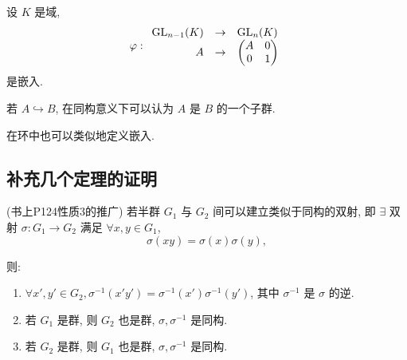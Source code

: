 \documentclass[color=black,device=normal,lang=cn,mode=geye]{elegantnote}
\begin{document}
\begin{example}
    设 $K$ 是域,
    \[\varphi:\begin{array}{rcl}
        \operatorname{GL} _{n-1}(K) & \to & \operatorname{GL} _n(K) \\
        A & \to & \begin{pmatrix}
            A & 0 \\
            0 & 1 \\
        \end{pmatrix} \\
    \end{array}\]
    是嵌入.
\end{example}
若 $A\hookrightarrow B$, 在同构意义下可以认为 $A$ 是 $B$ 的一个子群.

在环中也可以类似地定义嵌入.
\subsection{补充几个定理的证明}
\begin{theorem}(书上P124性质3的推广)\label{t2.1}
    若半群 $G_1$ 与 $G_2$ 间可以建立类似于同构的双射, 即 $\exists$ 双射 $\sigma:G_1\to G_2$ 满足 $\forall x,y\in G_1$,
    \begin{equation}\label{eq2.1}
        \sigma(xy)=\sigma(x)\sigma(y),
    \end{equation}

    则:
    \begin{enumerate}
        \def\labelenumi{(\arabic{enumi})}
        \item $\forall x',y'\in G_2,\sigma^{-1}(x'y')=\sigma^{-1}(x')\sigma^{-1}(y')$, 其中 $\sigma^{-1}$ 是 $\sigma$ 的逆.
        \item 若 $G_1$ 是群, 则 $G_2$ 也是群, $\sigma,\sigma^{-1}$ 是同构.
        \item 若 $G_2$ 是群, 则 $G_1$ 也是群, $\sigma,\sigma^{-1}$ 是同构.
    \end{enumerate}
\end{theorem}
\end{document}
